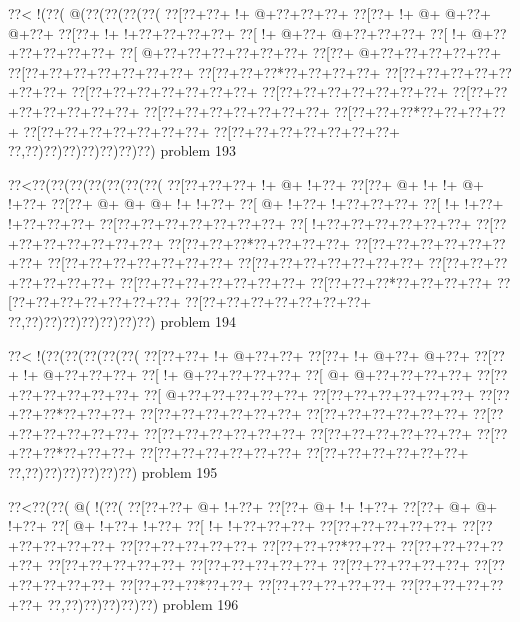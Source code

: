 \vbox{\vbox{\goo
\0??<\- !(\0??(\- @(\0??(\0??(\0??(\0??(
\0??[\0??+\0??+\- !+\- @+\0??+\0??+\0??+
\0??[\0??+\- !+\- @+\- @+\0??+\- @+\0??+
\0??[\0??+\- !+\- !+\0??+\0??+\0??+\0??+
\0??[\- !+\- @+\0??+\- @+\0??+\0??+\0??+
\0??[\- !+\- @+\0??+\0??+\0??+\0??+\0??+
\0??[\- @+\0??+\0??+\0??+\0??+\0??+\0??+
\0??[\0??+\- @+\0??+\0??+\0??+\0??+\0??+
\0??[\0??+\0??+\0??+\0??+\0??+\0??+\0??+
\0??[\0??+\0??+\0??*\0??+\0??+\0??+\0??+
\0??[\0??+\0??+\0??+\0??+\0??+\0??+\0??+
\0??[\0??+\0??+\0??+\0??+\0??+\0??+\0??+
\0??[\0??+\0??+\0??+\0??+\0??+\0??+\0??+
\0??[\0??+\0??+\0??+\0??+\0??+\0??+\0??+
\0??[\0??+\0??+\0??+\0??+\0??+\0??+\0??+
\0??[\0??+\0??+\0??*\0??+\0??+\0??+\0??+
\0??[\0??+\0??+\0??+\0??+\0??+\0??+\0??+
\0??[\0??+\0??+\0??+\0??+\0??+\0??+\0??+
\0??,\0??)\0??)\0??)\0??)\0??)\0??)\0??)
}
\hfil problem 193\hfil\break
}

\vbox{\vbox{\goo
\0??<\0??(\0??(\0??(\0??(\0??(\0??(\0??(
\0??[\0??+\0??+\0??+\- !+\- @+\- !+\0??+
\0??[\0??+\- @+\- !+\- !+\- @+\- !+\0??+
\0??[\0??+\- @+\- @+\- @+\- !+\- !+\0??+
\0??[\- @+\- !+\0??+\- !+\0??+\0??+\0??+
\0??[\- !+\- !+\0??+\- !+\0??+\0??+\0??+
\0??[\0??+\0??+\0??+\0??+\0??+\0??+\0??+
\0??[\- !+\0??+\0??+\0??+\0??+\0??+\0??+
\0??[\0??+\0??+\0??+\0??+\0??+\0??+\0??+
\0??[\0??+\0??+\0??*\0??+\0??+\0??+\0??+
\0??[\0??+\0??+\0??+\0??+\0??+\0??+\0??+
\0??[\0??+\0??+\0??+\0??+\0??+\0??+\0??+
\0??[\0??+\0??+\0??+\0??+\0??+\0??+\0??+
\0??[\0??+\0??+\0??+\0??+\0??+\0??+\0??+
\0??[\0??+\0??+\0??+\0??+\0??+\0??+\0??+
\0??[\0??+\0??+\0??*\0??+\0??+\0??+\0??+
\0??[\0??+\0??+\0??+\0??+\0??+\0??+\0??+
\0??[\0??+\0??+\0??+\0??+\0??+\0??+\0??+
\0??,\0??)\0??)\0??)\0??)\0??)\0??)\0??)
}
\hfil problem 194\hfil\break
}

\vbox{\vbox{\goo
\0??<\- !(\0??(\0??(\0??(\0??(\0??(
\0??[\0??+\0??+\- !+\- @+\0??+\0??+
\0??[\0??+\- !+\- @+\0??+\- @+\0??+
\0??[\0??+\- !+\- @+\0??+\0??+\0??+
\0??[\- !+\- @+\0??+\0??+\0??+\0??+
\0??[\- @+\- @+\0??+\0??+\0??+\0??+
\0??[\0??+\0??+\0??+\0??+\0??+\0??+
\0??[\- @+\0??+\0??+\0??+\0??+\0??+
\0??[\0??+\0??+\0??+\0??+\0??+\0??+
\0??[\0??+\0??+\0??*\0??+\0??+\0??+
\0??[\0??+\0??+\0??+\0??+\0??+\0??+
\0??[\0??+\0??+\0??+\0??+\0??+\0??+
\0??[\0??+\0??+\0??+\0??+\0??+\0??+
\0??[\0??+\0??+\0??+\0??+\0??+\0??+
\0??[\0??+\0??+\0??+\0??+\0??+\0??+
\0??[\0??+\0??+\0??*\0??+\0??+\0??+
\0??[\0??+\0??+\0??+\0??+\0??+\0??+
\0??[\0??+\0??+\0??+\0??+\0??+\0??+
\0??,\0??)\0??)\0??)\0??)\0??)\0??)
}
\hfil problem 195\hfil\break
}

\vbox{\vbox{\goo
\0??<\0??(\0??(\- @(\- !(\0??(
\0??[\0??+\0??+\- @+\- !+\0??+
\0??[\0??+\- @+\- !+\- !+\0??+
\0??[\0??+\- @+\- @+\- !+\0??+
\0??[\- @+\- !+\0??+\- !+\0??+
\0??[\- !+\- !+\0??+\0??+\0??+
\0??[\0??+\0??+\0??+\0??+\0??+
\0??[\0??+\0??+\0??+\0??+\0??+
\0??[\0??+\0??+\0??+\0??+\0??+
\0??[\0??+\0??+\0??*\0??+\0??+
\0??[\0??+\0??+\0??+\0??+\0??+
\0??[\0??+\0??+\0??+\0??+\0??+
\0??[\0??+\0??+\0??+\0??+\0??+
\0??[\0??+\0??+\0??+\0??+\0??+
\0??[\0??+\0??+\0??+\0??+\0??+
\0??[\0??+\0??+\0??*\0??+\0??+
\0??[\0??+\0??+\0??+\0??+\0??+
\0??[\0??+\0??+\0??+\0??+\0??+
\0??,\0??)\0??)\0??)\0??)\0??)
}
\hfil problem 196\hfil\break
}

